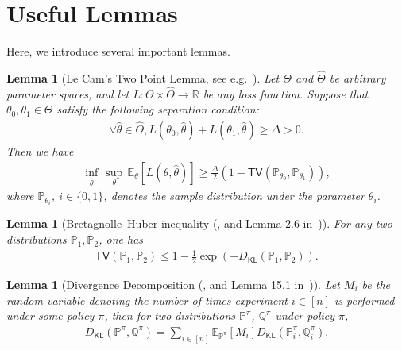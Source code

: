 \documentclass[journal, onecolumn]{IEEEtran}
\theoremstyle{plain}
\newtheorem{lemma}[theorem]{Lemma}
\theoremstyle{definition}
\theoremstyle{remark}
\begin{document}
  
% 




\appendices
\section{Useful Lemmas}\label{app:lemma}
Here, we introduce several important lemmas.

\begin{lemma}[Le Cam's Two Point Lemma, see e.g.~\citep{yu1997assouad}]\label{lem:lecam}
    Let $\Theta$ and $\hat{\Theta}$ be arbitrary parameter spaces, and let $L: \Theta \times \hat{\Theta} \to  \mathbb{R}$ be any loss function. Suppose that $\theta_0,\theta_1\in\Theta$ satisfy the following separation condition:
    \begin{align*}
    \forall {\hat{\theta}\in \hat{\Theta}}, L(\theta_0, \hat{\theta})+L(\theta_1, \hat{\theta})\geq \Delta>0.
    \end{align*}
    Then we have
    \begin{align*}
        \inf_{\hat{\theta}} \, \sup_\theta \, \mathbb{E}_\theta[L(\theta,\hat{\theta})]\geq \frac{\Delta}{2}\left(1-\mathsf{TV}(\mathbb{P}_{\theta_0},\mathbb{P}_{\theta_1})\right),
    \end{align*}
    where $\mathbb{P}_{\theta_i}$, $i\in \{0,1\}$, denotes the sample distribution under the parameter $\theta_i$.
\end{lemma}


\begin{lemma}[Bretagnolle–Huber inequality
 (\citep{bretagnolle79}, and Lemma 2.6 in~\citep{tsybakov2004introduction})] \label{lem:bh}
    For any two distributions $\mathbb{P}_1,\mathbb{P}_2$, one has
    \begin{align*}
        \mathsf{TV}(\mathbb{P}_1, \mathbb{P}_2)\leq 1-\frac{1}{2} \exp\left(-D_{\mathsf{KL}}(\mathbb{P}_1, \mathbb{P}_2)\right).
    \end{align*}
\end{lemma}

\begin{lemma}[Divergence Decomposition (\citep{auer1995gambling}, and Lemma 15.1 in~\citet{lattimore2020bandit})]\label{lem:div}
Let $M_i$ be the  random variable denoting the number of times experiment $i\in[n]$ is performed under some policy $\pi$, then for two distributions $\mathbb{P}^\pi$, $\mathbb{Q}^\pi$ under policy $\pi$,
\begin{align*}
    D_{\mathsf{KL}}(\mathbb{P}^\pi, \mathbb{Q}^\pi) = \sum_{i\in[n]}\mathbb{E}_{\mathbb{P}^\pi}[M_i] D_{\mathsf{KL}}(\mathbb{P}_i^\pi, \mathbb{Q}_i^\pi).
\end{align*}
\end{lemma}
\end{document}

